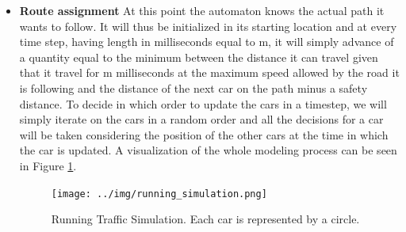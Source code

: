 \documentclass[11pt]{article}
\begin{document}
\begin{itemize}
\item \textbf{Route assignment}
At this point the automaton knows the actual path it wants to follow. It will thus be initialized in its starting location and at every time step, having length in milliseconds equal to m, it will simply advance of a quantity equal to the minimum between the distance it can travel given that it travel for m milliseconds at the maximum speed allowed by the road it is following and the distance of the next car on the path minus a safety distance. To decide in which order to update the cars in a timestep, we will simply iterate on the cars in a random order and all the decisions for a car will be taken considering the position of the other cars at the time in which the car is updated.
A visualization of the whole modeling process can be seen in Figure \ref{fig:run_sim}.

\begin{figure}[tb]
	\begin{center}
		\texttt{[image: ../img/running\_simulation.png]}
	\end{center}
	\caption{Running Traffic Simulation. Each car is represented by a circle.}
	\label{fig:run_sim}
\end{figure}
\end{itemize}
\end{document}
